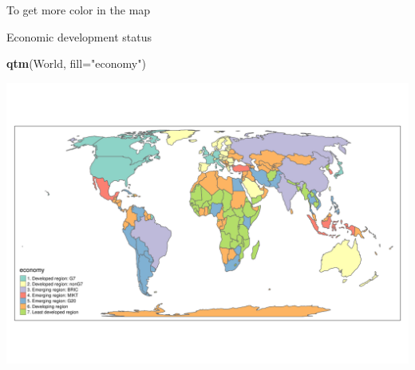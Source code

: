 \documentclass[
  ignorenonframetext,
]{beamer}
\newenvironment{Shaded}{\begin{snugshade}}{\end{snugshade}}
\newcommand{\DataTypeTok}[1]{\textcolor[rgb]{0.13,0.29,0.53}{#1}}
\newcommand{\KeywordTok}[1]{\textcolor[rgb]{0.13,0.29,0.53}{\textbf{#1}}}
\newcommand{\NormalTok}[1]{#1}
\newcommand{\StringTok}[1]{\textcolor[rgb]{0.31,0.60,0.02}{#1}}
\begin{document}
\begin{frame}[fragile]{To get more color in the map}
\protect\hypertarget{to-get-more-color-in-the-map}{}
\begin{block}{Economic development status}
\protect\hypertarget{economic-development-status}{}
\begin{Shaded}
\begin{Highlighting}[]
\KeywordTok{qtm}\NormalTok{(World, }\DataTypeTok{fill=}\StringTok{"economy"}\NormalTok{)}
\end{Highlighting}
\end{Shaded}

\includegraphics{quick_high_quality_maps_files/figure-beamer/unnamed-chunk-4-1.pdf}
\end{block}
\end{frame}
\end{document}
